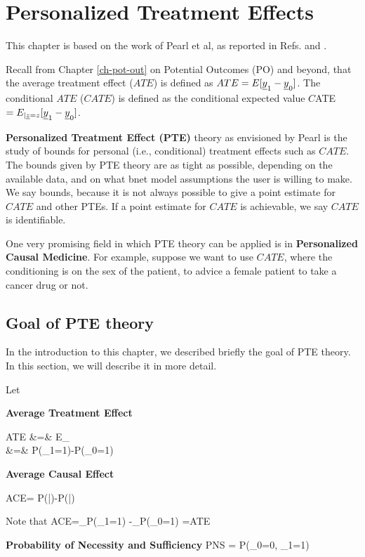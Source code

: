 \chapter{Personalized Treatment Effects}
\label{ch-personalized}


This chapter
is based on the work of Pearl et al, as reported in
Refs.
\cite{pearl-tian-2000} and
\cite{personalized-pearl-2021}.

Recall from Chapter \ref{ch-pot-out}
on Potential Outcomes (PO) 
and beyond, that
the average treatment effect ($ATE$) 
is defined as
$ATE=E[{\underline{y}}_1-{\underline{y}}_0]$.
The conditional $ATE$ ($CATE$) is defined as
the conditional expected value
$C$ATE$=E_{|{\underline{z}}=z}[{\underline{y}}_1-{\underline{y}}_0]$.


{\bf
Personalized Treatment Effect (PTE)}
theory
as envisioned by Pearl
is the study 
of
bounds
for personal (i.e., conditional)
 treatment
effects such as $CATE$. The
bounds given by PTE theory
are
as tight as possible,
depending on 
the available data,
and on what bnet model 
assumptions
the user is willing to make.
We say bounds, because 
it is not always possible
to give a point estimate
for $CATE$ and other
PTEs.
If a point estimate for $CATE$
is achievable, we say $CATE$
is identifiable.

One 
very promising
field in 
which PTE theory
can be applied
is in {\bf Personalized Causal Medicine}.
For example, suppose we want to
 use $CATE$, 
where the conditioning is on the
sex of the patient,
to advice a female  patient
to take a cancer drug or not.

\section{Goal of PTE theory}
In the introduction
to this chapter,
we described 
briefly
the goal of PTE theory. 
In this section,
we will describe it
in more detail.

Let

{\bf Average Treatment Effect}


\beqa
ATE &=& E_\s[y^\s_1-y^\s_0]
\\
&=&
P(\rvy_1=1)-P(\rvy_0=1)
\eeqa

{\bf Average Causal Effect}

\beq
ACE= P(|\cald{})-P(|\cald{})
\eeq

Note that
\beq
ACE=_{P(\rvy_1=1)}
-_{P(\rvy_0=1)}
=ATE\eeq


{\bf Probability of Necessity and Sufficiency}
\beq
PNS = P(\rvy_0=0, \rvy_1=1)
\eeq

